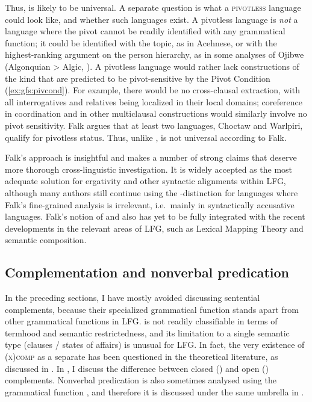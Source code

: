 \documentclass[output=paper]{../langscibook}
\begin{document}
 Thus, \GFHAT is likely to be universal. A separate question is what a \textsc{pivotless} language could look like, and whether such languages exist. A pivotless language is \textit{not} a language where the pivot cannot be readily identified with any grammatical function; it could be identified with the topic, as in Acehnese, or with the highest-ranking argument on the person hierarchy, as in some analyses of Ojibwe (Algonquian > Algic, \cite{rhodes1994}). A pivotless language would rather lack constructions of the kind that are predicted to be pivot-sensitive by the Pivot Condition (\ref{ex:gfs:pivcond}). For example, there would be no cross-clausal extraction, with all interrogatives and relatives being localized in their local domains; coreference in coordination and in other multiclausal constructions would similarly involve no pivot sensitivity. Falk argues that at least two languages, Choctaw and Warlpiri, qualify for pivotless status.  Thus, unlike \GFHAT, \PIVOT is not universal according to Falk.
 
 Falk's approach is insightful and makes a number of strong claims that deserve more thorough cross-linguistic investigation. It is widely accepted as the most adequate solution for ergativity and other syntactic alignments within LFG, although many authors still continue using the \SUBJ-\OBJ distinction for languages where Falk's fine-grained analysis is irrelevant, i.e.\ mainly in syntactically accusative languages. Falk's notion of \GFHAT and \PIVOT also has yet to be fully integrated with the recent developments in the relevant areas of LFG, such as Lexical Mapping Theory and semantic composition. 

 
 \subsection{Complementation and nonverbal predication\label{sect:gfs:complementation}}
 
 In the preceding sections, I have mostly avoided discussing sentential complements, because their specialized grammatical function \COMP stands apart from other grammatical functions in LFG. \COMP is not readily classifiable in terms of termhood and semantic restrictedness, and its limitation to a single semantic type (clauses / states of affairs) is unusual for LFG. In fact, the very existence of \textsc{(x)comp} as a separate \GF has been questioned in the theoretical literature, as discussed in . In , I discuss the difference between closed (\COMP) and open (\XCOMP) complements. Nonverbal predication is also sometimes analysed using the grammatical function \XCOMP, and therefore it is discussed under the same umbrella in .
\end{document}
